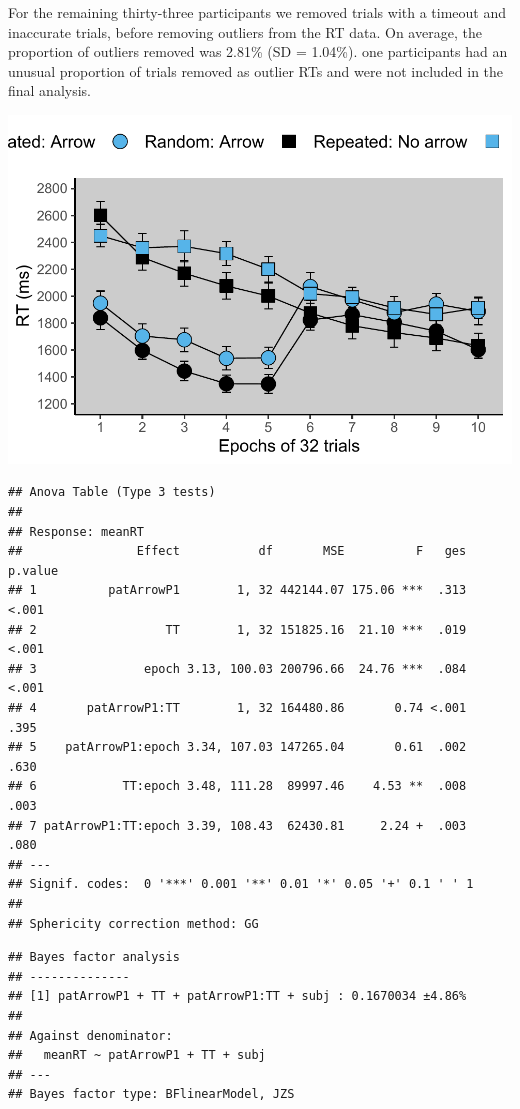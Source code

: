 \documentclass[
  man]{apa7}
\begin{document}
For the remaining thirty-three participants we removed trials with a timeout and inaccurate trials, before removing outliers from the RT data. On average, the proportion of outliers removed was 2.81\% (SD = 1.04\%). one participants had an unusual proportion of trials removed as outlier RTs and were not included in the final analysis.

\includegraphics{CCC_ms1_files/figure-latex/Exp2-RT-figure-1.pdf}

\begin{verbatim}
## Anova Table (Type 3 tests)
## 
## Response: meanRT
##                Effect           df       MSE          F   ges p.value
## 1          patArrowP1        1, 32 442144.07 175.06 ***  .313   <.001
## 2                  TT        1, 32 151825.16  21.10 ***  .019   <.001
## 3               epoch 3.13, 100.03 200796.66  24.76 ***  .084   <.001
## 4       patArrowP1:TT        1, 32 164480.86       0.74 <.001    .395
## 5    patArrowP1:epoch 3.34, 107.03 147265.04       0.61  .002    .630
## 6            TT:epoch 3.48, 111.28  89997.46    4.53 **  .008    .003
## 7 patArrowP1:TT:epoch 3.39, 108.43  62430.81     2.24 +  .003    .080
## ---
## Signif. codes:  0 '***' 0.001 '**' 0.01 '*' 0.05 '+' 0.1 ' ' 1
## 
## Sphericity correction method: GG
\end{verbatim}

\begin{verbatim}
## Bayes factor analysis
## --------------
## [1] patArrowP1 + TT + patArrowP1:TT + subj : 0.1670034 ±4.86%
## 
## Against denominator:
##   meanRT ~ patArrowP1 + TT + subj 
## ---
## Bayes factor type: BFlinearModel, JZS
\end{verbatim}
\end{document}
